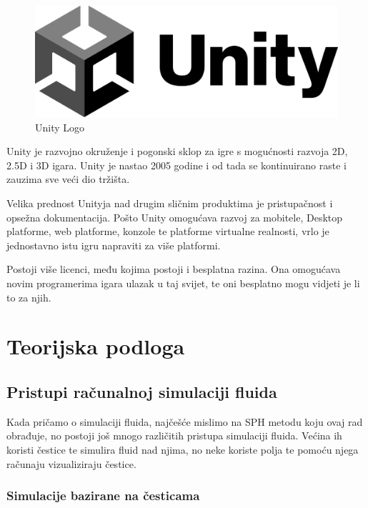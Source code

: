 \documentclass[diplomskirad]{fer}
\begin{document}
    \begin{figure}[H]
        \centering
        \includegraphics[scale=0.3]{images/unityLogo}
        \caption{
            Unity Logo \cite{unityLogo}
        }
        \label{fig:unityLogo}
    \end{figure}

    Unity je razvojno okruženje i pogonski sklop za igre s mogućnosti razvoja 2D, 2.5D i 3D igara.
    Unity je nastao 2005 godine i od tada se kontinuirano raste i zauzima sve veći dio tržišta.

    Velika prednost Unityja nad drugim sličnim produktima je pristupačnost i opsežna dokumentacija.
    Pošto Unity omogućava razvoj za mobitele, Desktop platforme, web platforme, konzole te platforme virtualne realnosti,
    vrlo je jednostavno istu igru napraviti za više platformi.

    Postoji više licenci, među kojima postoji i besplatna razina.
    Ona omogućava novim programerima igara ulazak u taj svijet, te oni besplatno mogu vidjeti je li to za njih.



    \chapter{Teorijska podloga}\label{ch:teorijska-podloga}

    \section{Pristupi računalnoj simulaciji fluida}\label{sec:pristupi-racunalnoj-simulaciji-fluida}

    Kada pričamo o simulaciji fluida, najčešće mislimo na SPH metodu koju ovaj rad obrađuje, no postoji još mnogo
    različitih pristupa simulaciji fluida.
    Većina ih koristi čestice te simulira fluid nad njima, no neke koriste polja te pomoću njega računaju vizualiziraju čestice.

    \subsection{Simulacije bazirane na česticama}\label{subsec:simulacije-bazirane-na-cesticama}
\end{document}
